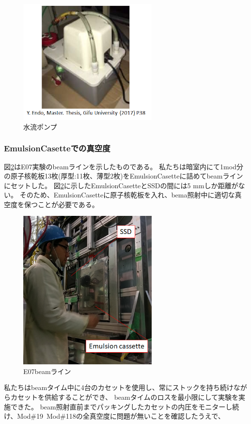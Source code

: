 \documentclass[12pt,a4paper]{jarticle}
\begin{document}
\begin{figure}[htbp]
  \centering
    \includegraphics[width=70mm]{ponpu.png}
  \caption{水流ポンプ\label{fig:ponpu}}
\end{figure}
\newpage
\subsubsection{EmulsionCasetteでの真空度}
図\ref{fig:e07setup_real}はE07実験のbeamラインを示したものである。
私たちは暗室内にて1mod分の原子核乾板13枚(厚型:11枚、薄型2枚)をEmulsionCasetteに詰めてbeamラインにセットした。
図\ref{fig:e07setup_real}に示したEmulsionCasetteとSSDの間には5 mmしか距離がない。
そのため、EmulsionCasetteに原子核乾板を入れ、bema照射中に適切な真空度を保つことが必要である。
\begin{figure}[htbp]
  \centering
    \includegraphics[width=70mm]{e07setup_real.png}
  \caption{E07beamライン\label{fig:e07setup_real}}
\end{figure}
\par
私たちはbeamタイム中に4台のカセットを使用し、常にストックを持ち続けながらカセットを供給することができ、
beamタイムのロスを最小限にして実験を実施できた。
beam照射直前までパッキングしたカセットの内圧をモニターし続け、Mod$\#$19~Mod$\#$118の全真空度に問題が無いことを確認したうえで、
\end{document}
